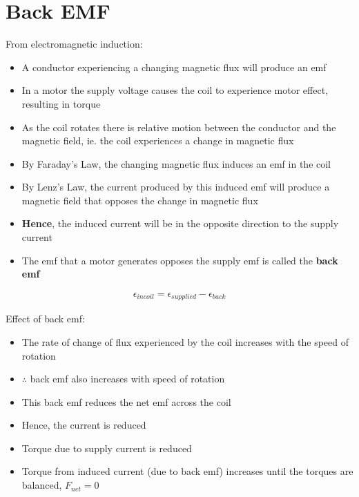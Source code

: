 \section{Back EMF}

	From electromagnetic induction:
	\begin{itemize}
		\item A conductor experiencing a changing magnetic flux will produce an emf
		\item In a motor the supply voltage causes the coil to experience motor effect, resulting in torque
		\item As the coil rotates there is relative motion between the conductor and the magnetic field, ie. the coil experiences a change in magnetic flux
		\item By Faraday's Law, the changing magnetic flux induces an emf in the coil
		\item By Lenz's Law, the current produced by this induced emf will produce a magnetic field that opposes the change in magnetic flux
		\item \textbf{Hence}, the induced current will be in the opposite direction to the supply current
		\item The emf that a motor generates opposes the supply emf is called the \textbf{back emf}
	\end{itemize}

	\begin{align*}
		\epsilon_{in coil} = \epsilon_{supplied} - \epsilon_{back}
	\end{align*}

	Effect of back emf:
	\begin{itemize}
		\item The rate of change of flux experienced by the coil increases with the speed of rotation
		\item $\therefore$ back emf also increases with speed of rotation
		\item This back emf reduces the net emf across the coil
		\item Hence, the current is reduced
		\item Torque due to supply current is reduced
		\item Torque from induced current (due to back emf) increases until the torques are balanced, $F_{net} = 0$
	\end{itemize}

